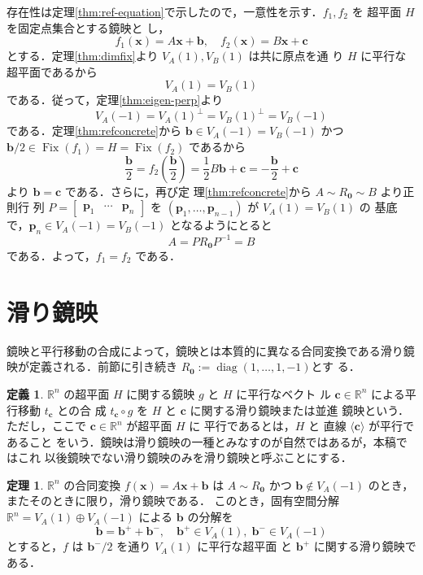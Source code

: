 \documentclass[11pt, uplatex, dvipdfmx, titlepage]{jsarticle}
\makeatletter
\DeclareMathOperator{\Fix}{Fix}
\DeclareMathOperator{\diag}{diag}
\renewenvironment{proof}[1][\proofname]{\par
  \pushQED{\qed}%
  \normalfont \topsep6\p@\@plus6\p@\relax
  \trivlist
  \item[\hskip\labelsep
         \bfseries
    {#1}]\ignorespaces
}{%
  \popQED\endtrivlist\@endpefalse
}
\theoremstyle{definition}
\newtheorem{theorem}{定理}[section]
\newtheorem*{definition}{定義}
\renewcommand{\proofname}{\textbf{証明}}
\makeatother
\begin{document}
\begin{proof}
  
  存在性は定理\ref{thm:ref-equation}で示したので，一意性を示す．$f_1,
  f_2$ を 超平面 $H$ を固定点集合とする鏡映と
  し，
  \[
    f_1(\bm{x}) = A\bm{x} + \bm{b}, \quad f_2(\bm{x}) = B\bm{x} + \bm{c}
  \]
  とする．定理\ref{thm:dimfix}より $V_A(1), V_B(1)$ は共に原点を通
  り $H$ に平行な超平面であるから
  \[
    V_A(1) = V_B(1)
  \]
  である．従って，定理\ref{thm:eigen-perp}より
  \[
    V_A(-1) = V_A(1)^{\perp} = V_B(1)^{\perp} = V_B(-1)
  \]
  である．定理\ref{thm:refconcrete}から $\bm{b} \in
  V_A(-1) = V_B(-1)$ かつ $\bm{b}/2 \in \Fix(f_1) = H = \Fix(f_2)$ であるから
  \[
    \frac{\bm{b}}{2} = f_2\left( \frac{\bm{b}}{2}\right) = \frac{1}{2} B \bm{b} + \bm{c} 
    = -\frac{\bm{b}}{2} + \bm{c} 
  \]
  より $\bm{b} = \bm{c}$ である．さらに，再び定
  理\ref{thm:refconcrete}から $A \sim R_{\bm{0}} \sim B$ より正則行
  列 $P=\left[
    \begin{array}{ccc}
      \bm{p}_1 & \cdots & \bm{p}_n
    \end{array}
  \right]$ を $(\bm{p}_1, \ldots, \bm{p}_{n-1})$ が $V_A(1)=V_B(1)$ の
  基底で，$\bm{p}_n \in V_A(-1)=V_B(-1)$ となるようにとると
  \[
    A= P R_{\bm{0}} P^{-1}  = B
  \]
  である．よって，$f_1 = f_2$ である．
\end{proof}

\section{滑り鏡映}\label{sec:glide}

鏡映と平行移動の合成によって，鏡映とは本質的に異なる合同変換である滑り鏡
映が定義される．前節に引き続き $ R_{\bm{0}}:=\diag(1,\ldots, 1,-1)$とす
る．

\begin{definition}
  $\mathbb{R}^n$ の超平面 $H$ に関する鏡映 $g$ と $H$ に平行なベクト
  ル $\bm{c} \in \mathbb{R}^n$ による平行移動 $t_{\bm{c}}$ との合
  成 $t_{\bm{c}} \circ g$ を $H$ と $\bm{c}$ に関する滑り鏡映または並進
  鏡映という．ただし，ここで $\bm{c} \in \mathbb{R}^n$ が超平面 $H$ に
  平行であるとは，$H$ と 直線 $\langle \bm{c} \rangle$ が平行であること
  をいう．鏡映は滑り鏡映の一種とみなすのが自然ではあるが，本稿ではこれ
  以後鏡映でない滑り鏡映のみを滑り鏡映と呼ぶことにする．
\end{definition}


\begin{theorem}\label{thm:glide}
  $\mathbb{R}^n$ の合同変換 $f(\bm{x}) = A\bm{x} + \bm{b}$ は $A \sim R_{\bm{0}}$ かつ
  $\bm{b} \notin V_A(-1)$ のとき，またそのときに限り，滑り鏡映である．
  このとき，固有空間分解 $\mathbb{R}^n = V_A(1) \oplus V_A(-1)$ による $\bm{b}$ の分解を
  \begin{equation}\label{eq:eigendecomp-gen}
    \bm{b} = \bm{b}^{+} + \bm{b}^{-}, \quad \bm{b}^{+} \in V_A(1), \; \bm{b}^{-} \in V_A(-1)
  \end{equation}
  とすると，$f$ は $\bm{b}^{-}/2$ を通り $V_A(1)$ に平行な超平面
  と $\bm{b}^{+}$ に関する滑り鏡映である．
\end{theorem}
\end{document}

